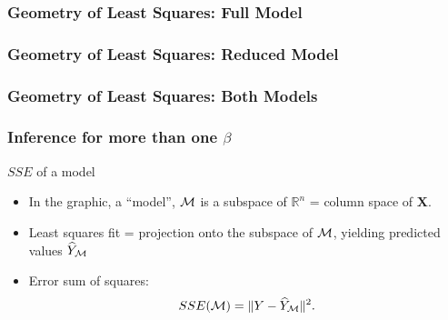 \documentclass[handout]{beamer}
\begin{document}

   \begin{frame} \frametitle{Geometry of Least Squares: Full Model}

   \end{frame}


   \begin{frame} \frametitle{Geometry of Least Squares: Reduced Model}

   \end{frame}


   \begin{frame} \frametitle{Geometry of Least Squares: Both Models}

   \end{frame}


   \begin{frame} \frametitle{Inference for more than one $\beta$}

   \begin{block}
   {$SSE$ of a model}
   \begin{itemize}[<+->]
   \item In the graphic, a ``model'', ${\cal M}$ is a subspace of $\mathbb{R}^n$ = column space of $\pmb{X}$.


   \item Least squares fit = projection onto the subspace of ${\cal M}$,
   yielding predicted values $\widehat{Y}_{{\cal M}}$

   \item Error sum of squares:
   $$
   SSE({\cal M}) = \|Y - \widehat{Y}_{{\cal M}}\|^2.
   $$
   \end{itemize}
   \end{block}
   \end{frame}

\end{document}
